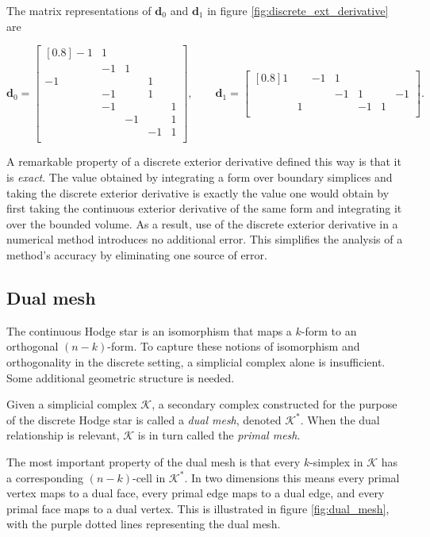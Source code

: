 \documentclass[utf8,english]{gradu3}
\begin{document}
The matrix representations of $\mathbf{d}_0$ and $\mathbf{d}_1$
in figure \ref{fig:discrete_ext_derivative} are

\[
  \mathbf{d}_0 = \begin{bmatrix}[0.8]
    -1 & 1 \\
       & -1 & 1 \\
    -1 & & & 1 \\
       & -1 & & 1 \\
       & -1 & & & 1 \\
       & & -1 & & 1 \\
       & & & -1 & 1 \\
  \end{bmatrix},
  \qquad
  \mathbf{d}_1 = \begin{bmatrix}[0.8]
    1 & & -1 & 1 \\
      & & & -1 & 1 & & -1 \\
      & 1 & & & -1 & 1 \\
  \end{bmatrix}.
\]

A remarkable property of a discrete exterior derivative
defined this way is that it is \textit{exact}.
The value obtained by integrating a form over boundary simplices
and taking the discrete exterior derivative
is exactly the value one would obtain
by first taking the continuous exterior derivative of the same form
and integrating it over the bounded volume.
As a result, use of the discrete exterior derivative in a numerical method
introduces no additional error.
This simplifies the analysis of a method's accuracy
by eliminating one source of error.


\subsection{Dual mesh}\label{sec:dual_mesh}

The continuous Hodge star is an isomorphism
that maps a $k$-form to an orthogonal $(n-k)$-form.
To capture these notions of isomorphism and orthogonality
in the discrete setting, a simplicial complex alone is insufficient.
Some additional geometric structure is needed.

Given a simplicial complex $\mathcal{K}$,
a secondary complex constructed for the purpose of the discrete Hodge star
is called a \textit{dual mesh}, denoted $\mathcal{K}^*$.
When the dual relationship is relevant,
$\mathcal{K}$ is in turn called the \textit{primal mesh}.

The most important property of the dual mesh
is that every $k$-simplex in $\mathcal{K}$
has a corresponding $(n-k)$-cell in $\mathcal{K}^*$.
In two dimensions this means every primal vertex maps to a dual face,
every primal edge maps to a dual edge, and every primal face maps to a dual vertex.
This is illustrated in figure \ref{fig:dual_mesh},
with the purple dotted lines representing the dual mesh.
\end{document}
